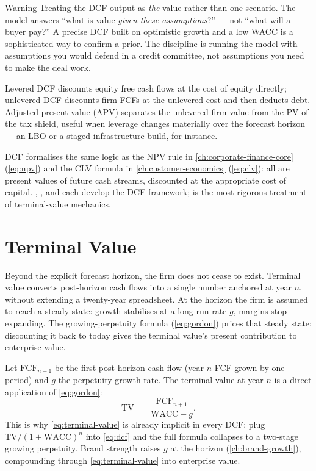 \begin{admonition}{Warning}
Treating the DCF output as \emph{the} value rather than one scenario. The model
answers ``what is value \emph{given these assumptions}?'' --- not ``what will a
buyer pay?'' A precise DCF built on optimistic growth and a low WACC is a
sophisticated way to confirm a prior. The discipline is running the model with
assumptions you would defend in a credit committee, not assumptions you need to
make the deal work.
\end{admonition}

Levered DCF discounts equity free cash flows at the cost of equity directly; unlevered DCF
discounts firm FCFs at the unlevered cost and then deducts debt. Adjusted present value
(APV) separates the unlevered firm value from the PV of the tax shield, useful when
leverage changes materially over the forecast horizon --- an LBO or a staged infrastructure
build, for instance.

DCF formalises the same logic as the NPV rule in \cref{ch:corporate-finance-core}
(\cref{eq:npv}) and the CLV formula in \cref{ch:customer-economics} (\cref{eq:clv}):
all are present values of future cash streams, discounted at the appropriate cost
of capital. \textcite{brealey2020}, \textcite{damodaran2012}, and
\textcite{berk6thcorporate} each develop the DCF framework; \textcite{damodaran2012}
is the most rigorous treatment of terminal-value mechanics.

\section{Terminal Value}\label{sec:terminal-value}

Beyond the explicit forecast horizon, the firm does not cease to exist. Terminal value
converts post-horizon cash flows into a single number anchored at year \(n\), without
extending a twenty-year spreadsheet. At the horizon the firm is assumed to reach a
steady state: growth stabilises at a long-run rate \(g\), margins stop expanding. The
growing-perpetuity formula (\cref{eq:gordon}) prices that steady state; discounting it
back to today gives the terminal value's present contribution to enterprise value.

Let \(\mathrm{FCF}_{n+1}\) be the first post-horizon cash flow (year \(n\) FCF grown by
one period) and \(g\) the perpetuity growth rate. The terminal value at year \(n\) is a
direct application of \cref{eq:gordon}:
\begin{equation}\label{eq:terminal-value}
  \mathrm{TV} \;=\; \frac{\mathrm{FCF}_{n+1}}{\mathrm{WACC}-g}.
\end{equation}
This is why \cref{eq:terminal-value} is already implicit in every DCF: plug
\(\mathrm{TV}/(1+\mathrm{WACC})^n\) into \cref{eq:dcf} and the full formula collapses to
a two-stage growing perpetuity. Brand strength raises \(g\) at the horizon
(\cref{ch:brand-growth}), compounding through \cref{eq:terminal-value} into enterprise
value.

